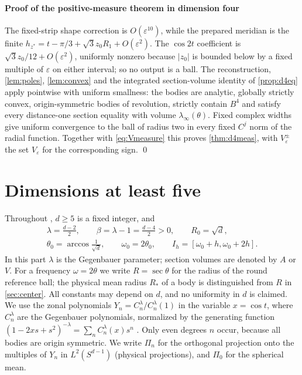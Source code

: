 \documentclass[11pt]{amsart}
\numberwithin{equation}{section}
\theoremstyle{definition}
\theoremstyle{remark}
\newcommand{\eps}{\varepsilon}
\newcommand{\abs}[1]{\lvert #1\rvert}
\begin{document}
\subsection{Proof of the positive-measure theorem in dimension four}
The fixed-strip shape correction is $O(\eps^{10})$, while the prepared meridian is the finite $h_{z^*}=t-\pi/3+\sqrt3z_0R_1+O(\eps^2)$. The $\cos2t$ coefficient is $\sqrt3z_0/12+O(\eps^2)$, uniformly nonzero because $\abs{z_0}$ is bounded below by a fixed multiple of $\eps$ on either interval; so no output is a ball. The reconstruction, \cref{lem:poles}, \cref{lem:convex} and the integrated section-volume identity of \cref{prop:d4eq} apply pointwise with uniform smallness: the bodies are analytic, globally strictly convex, origin-symmetric bodies of revolution, strictly contain $B^4$ and satisfy every distance-one section equality with volume $\lambda_\infty(\theta)$. Fixed complex widths give uniform convergence to the ball of radius two in every fixed $C^j$ norm of the radial function. Together with \eqref{eq:Vmeasure} this proves \cref{thm:d4meas}, with $V_\eps^\pm$ the set $V_\eps$ for the corresponding sign. \qed

\part{Dimensions at least five}\label{part:d5}

Throughout \cref{part:d5}, $d\ge5$ is a fixed integer, and
\begin{gather*}
\lambda=\tfrac{d-2}2,\qquad \beta=\lambda-1=\tfrac{d-4}2>0,\qquad R_0=\sqrt d,\\
\theta_0=\arccos\tfrac1{\sqrt d},\qquad \omega_0=2\theta_0,\qquad I_h=[\omega_0+h,\omega_0+2h].
\end{gather*}
In this part $\lambda$ is the Gegenbauer parameter; section volumes are denoted by $A$ or $V$. For a frequency $\omega=2\theta$ we write $R=\sec\theta$ for the radius of the round reference ball; the physical mean radius $R_*$ of a body is distinguished from $R$ in \cref{sec:center}. All constants may depend on $d$, and no uniformity in $d$ is claimed. We use the zonal polynomials $Y_n=C_n^\lambda/C_n^\lambda(1)$ in the variable $x=\cos t$, where $C^\lambda_n$ are the Gegenbauer polynomials, normalized by the generating function $(1-2xs+s^2)^{-\lambda}=\sum_nC^\lambda_n(x)s^n$ \cite[(18.12.4)]{DLMF}. Only even degrees $n$ occur, because all bodies are origin symmetric. We write $\Pi_n$ for the orthogonal projection onto the multiples of $Y_n$ in $L^2(S^{d-1})$ (physical projections), and $\Pi_0$ for the spherical mean.
\end{document}
